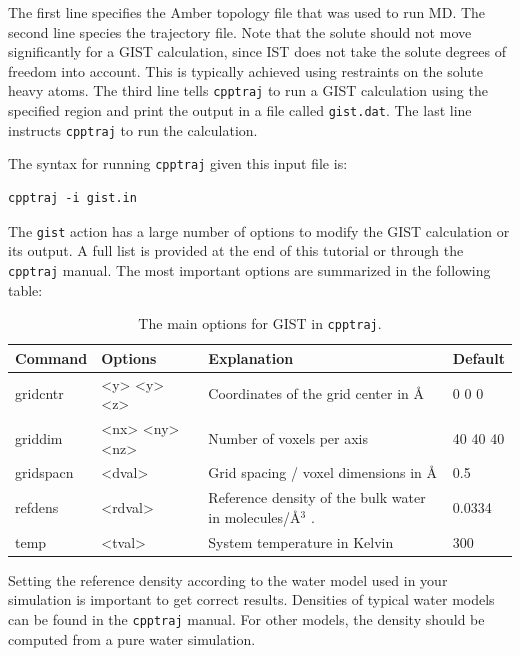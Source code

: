 \documentclass[9pt,tutorial]{livecoms}
\newcommand{\software}{\texttt}
\newcommand\inlinecode{\texttt}
\begin{document}
The first line specifies the Amber topology file that was used to run MD. The second line species the trajectory file.
Note that the solute should not move significantly for a GIST calculation, since IST does not take the solute degrees of freedom into account.
This is typically achieved using restraints on the solute heavy atoms.
The third line tells \software{cpptraj} to run a GIST calculation using the specified region and print the output in a file called \inlinecode{gist.dat}.
The last line instructs \software{cpptraj} to run the calculation.

The syntax for running \software{cpptraj} given this input file is:
\begin{lstlisting}[style=bash]
cpptraj -i gist.in
\end{lstlisting}

The \inlinecode{gist} action has a large number of options to modify the GIST calculation or its output.
A full list is provided at the end of this tutorial or through the \software{cpptraj} manual.
The most important options are summarized in the following table:

\begin{table}[h]
	\caption{The main options for GIST in \software{cpptraj}.}\label{tab:GIST_options}
	\small
	\begin{tabularx}{\columnwidth}{@{}llXl@{}}
		\toprule
		Command       & Options & Explanation & Default  \\
		\midrule
		gridcntr    & <y> <y> <z> & Coordinates of the grid center in \AA & 0 0 0  \\
		griddim     & <nx> <ny> <nz> & Number of voxels per axis & 40 40 40\pdfcomment{Overfull hbox?}\\
		gridspacn & <dval> &Grid spacing / voxel dimensions in  \AA & 0.5    \\
		refdens         & <rdval> & Reference density of the bulk water in molecules/\AA$^3$ . & 0.0334    \\
		temp & <tval> & System temperature in Kelvin & 300 \\
		\bottomrule
	\end{tabularx}
\end{table}

Setting the reference density according to the water model used in your simulation is important to get correct results.
Densities of typical water models can be found in the \software{cpptraj} manual.
For other models, the density should be computed from a pure water simulation.
 
\end{document}
